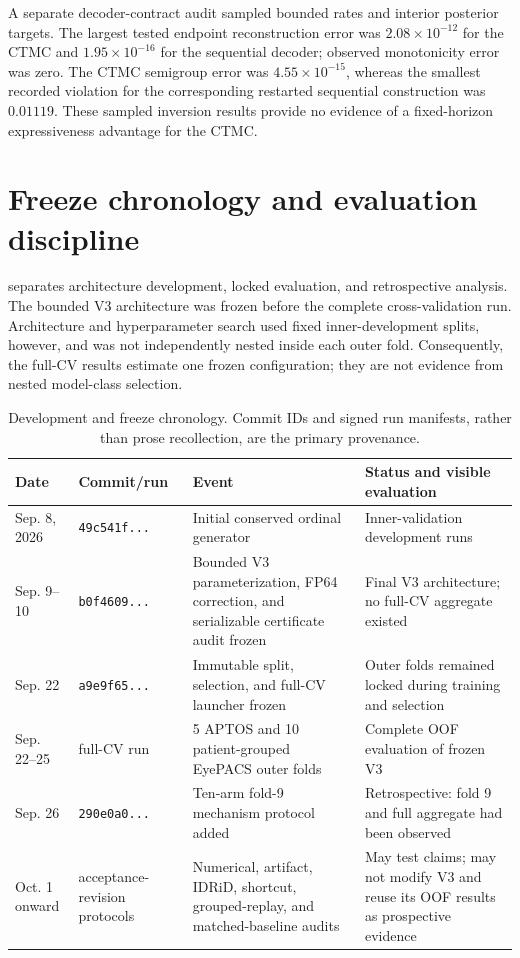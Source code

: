\documentclass[10pt,twocolumn,letterpaper]{article}
\begin{document}
A separate decoder-contract audit sampled bounded rates and interior posterior
targets.  The largest tested endpoint reconstruction error was
$2.08\times10^{-12}$ for the CTMC and $1.95\times10^{-16}$ for the sequential
decoder; observed monotonicity error was zero.  The CTMC semigroup error was
$4.55\times10^{-15}$, whereas the smallest recorded violation for the
corresponding restarted sequential construction was $0.01119$.  These sampled
inversion results provide no evidence of a fixed-horizon expressiveness
advantage for the CTMC.

\section{Freeze chronology and evaluation discipline}
\label{sec:chronology}

 separates architecture development, locked evaluation,
and retrospective analysis.  The bounded V3 architecture was frozen before
the complete cross-validation run.  Architecture and hyperparameter search
used fixed inner-development splits, however, and was not independently nested
inside each outer fold.  Consequently, the full-CV results estimate one frozen
configuration; they are not evidence from nested model-class selection.

\begin{table}[t]
  \centering
  \caption{Development and freeze chronology.  Commit IDs and signed run
  manifests, rather than prose recollection, are the primary provenance.}
  \label{tab:chronology}
  \small
  \setlength{\tabcolsep}{5pt}
  \begin{tabular}{@{}p{1.8cm}p{3.2cm}p{6.1cm}p{4.6cm}@{}}
    \toprule
    Date & Commit/run & Event & Status and visible evaluation \\
    \midrule
    Sep. 8, 2026 & \texttt{49c541f...} & Initial conserved ordinal generator & Inner-validation development runs \\
    Sep. 9--10 & \texttt{b0f4609...} & Bounded V3 parameterization, FP64 correction, and serializable certificate audit frozen & Final V3 architecture; no full-CV aggregate existed \\
    Sep. 22 & \texttt{a9e9f65...} & Immutable split, selection, and full-CV launcher frozen & Outer folds remained locked during training and selection \\
    Sep. 22--25 & full-CV run & 5 APTOS and 10 patient-grouped EyePACS outer folds & Complete OOF evaluation of frozen V3 \\
    Sep. 26 & \texttt{290e0a0...} & Ten-arm fold-9 mechanism protocol added & Retrospective: fold 9 and full aggregate had been observed \\
    Oct. 1 onward & acceptance-revision protocols & Numerical, artifact, IDRiD, shortcut, grouped-replay, and matched-baseline audits & May test claims; may not modify V3 and reuse its OOF results as prospective evidence \\
    \bottomrule
  \end{tabular}
\end{table}
\end{document}
